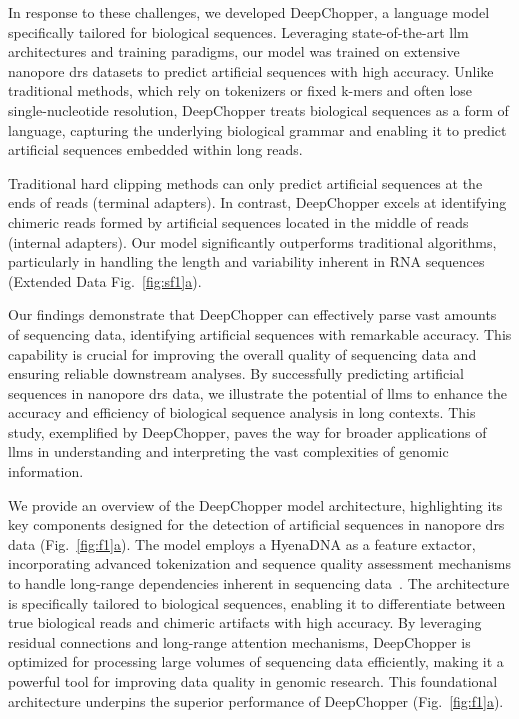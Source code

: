 \documentclass[pdflatex, sn-mathphys-num, lineno]{sn-jnl}%
\newcommand{\figref}[2]{Fig.~\hyperref[#1]{\ref*{#1}#2}}
\newcommand{\edfigref}[2]{Extended Data Fig.~\hyperref[#1]{\ref*{#1}#2}}
\theoremstyle{thmstyleone}%
\theoremstyle{thmstyletwo}%
\theoremstyle{thmstylethree}%
\begin{document}
In response to these challenges, we developed DeepChopper, a language model specifically tailored for biological sequences.
Leveraging state-of-the-art \gls{llm} architectures and training paradigms, our model was trained on extensive nanopore \gls{drs} datasets to predict artificial sequences with high accuracy.
Unlike traditional methods, which rely on tokenizers or fixed k-mers and often lose single-nucleotide resolution, DeepChopper treats biological sequences as a form of language, capturing the underlying biological grammar and enabling it to predict artificial sequences embedded within long reads.

Traditional hard clipping methods can only predict artificial sequences at the ends of reads (terminal adapters).
In contrast, DeepChopper excels at identifying chimeric reads formed by artificial sequences located in the middle of reads (internal adapters).
Our model significantly outperforms traditional algorithms, particularly in handling the length and variability inherent in RNA sequences (\edfigref{fig:sf1}{a}).

Our findings demonstrate that DeepChopper can effectively parse vast amounts of sequencing data, identifying artificial sequences with remarkable accuracy.
This capability is crucial for improving the overall quality of sequencing data and ensuring reliable downstream analyses.
By successfully predicting artificial sequences in nanopore \gls{drs} data, we illustrate the potential of \glspl{llm} to enhance the accuracy and efficiency of biological sequence analysis in long contexts.
This study, exemplified by DeepChopper, paves the way for broader applications of \glspl{llm} in understanding and interpreting the vast complexities of genomic information.


We provide an overview of the DeepChopper model architecture, highlighting its key components designed for the detection of artificial sequences in nanopore \gls{drs} data (\figref{fig:f1}{a}).
The model employs a HyenaDNA as a feature extactor, incorporating advanced tokenization and sequence quality assessment mechanisms to handle long-range dependencies inherent in sequencing data~\cite{nguyen2024hyenadna}.
The architecture is specifically tailored to biological sequences, enabling it to differentiate between true biological reads and chimeric artifacts with high accuracy.
By leveraging residual connections and long-range attention mechanisms, DeepChopper is optimized for processing large volumes of sequencing data efficiently, making it a powerful tool for improving data quality in genomic research.
This foundational architecture underpins the superior performance of DeepChopper (\figref{fig:f1}{a}).
\end{document}
